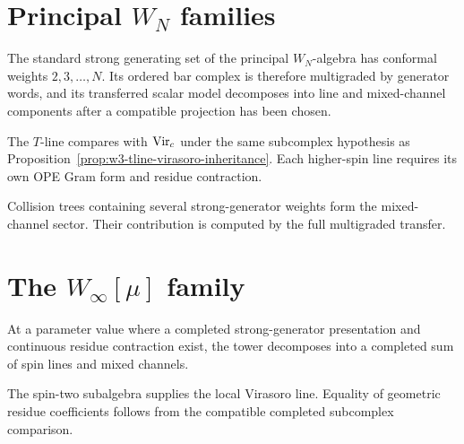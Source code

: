 \section{Principal \(W_N\) families}
\label{sec:wn-shadow-tower}

\begin{proposition}
\label{prop:wn-line-decomposition}
\ClaimStatusProvedHere
The standard strong generating set of the principal \(W_N\)-algebra
has conformal weights \(2,3,\ldots,N\).  Its ordered bar complex is
therefore multigraded by generator words, and its transferred scalar
model decomposes into line and mixed-channel components after a
compatible projection has been chosen.
\end{proposition}

\begin{proposition}
\label{prop:wn-tline-and-w-lines}
\ClaimStatusConditional
The \(T\)-line compares with \(\mathrm{Vir}_c\) under the same subcomplex
hypothesis as Proposition~\ref{prop:w3-tline-virasoro-inheritance}.
Each higher-spin line requires its own OPE Gram form and residue
contraction.
\end{proposition}

\begin{remark}
\label{rem:wn-mixed-line-channels}
Collision trees containing several strong-generator weights form the
mixed-channel sector.  Their contribution is computed by the full
multigraded transfer.
\end{remark}

\section{The \(W_\infty[\mu]\) family}
\label{sec:w-infinity-shadow}

\begin{proposition}
\label{prop:w-infinity-line-decomposition}
\ClaimStatusConditional
At a parameter value where a completed strong-generator presentation
and continuous residue contraction exist, the tower decomposes into a
completed sum of spin lines and mixed channels.
\end{proposition}

\begin{remark}
\label{rem:w-infinity-tline-recovers-virasoro}
The spin-two subalgebra supplies the local Virasoro line.  Equality of
geometric residue coefficients follows from the compatible completed
subcomplex comparison.
\end{remark}

